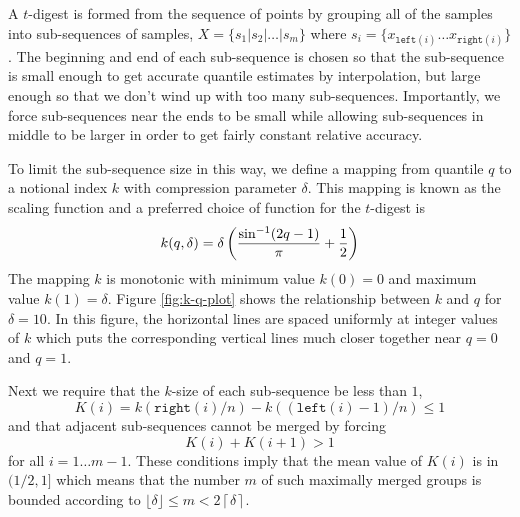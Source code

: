 \documentclass[11pt]{amsart}
\begin{document}
A $t$-digest is formed from the sequence of points by grouping all of the samples into sub-sequences of samples, $X = \lbrace s_1 | s_2 | \ldots | s_m \rbrace$ where $s_i = \lbrace x_{\mathtt {left}(i)} \ldots x_{\mathtt{right}(i)} \rbrace$.  The beginning and end of each sub-sequence is chosen so that the sub-sequence is small enough to get accurate quantile estimates by interpolation, but large enough so that we don't wind up with too many sub-sequences. Importantly, we force sub-sequences near the ends to be small while allowing sub-sequences in middle to be larger in order to get fairly constant relative accuracy.

To limit the sub-sequence size in this way, we define a mapping from quantile $q$ to a notional index $k$ with compression parameter $\delta$. This mapping is known as the scaling function and a preferred choice of function for the $t$-digest is 
\[
k(q, \delta) = \delta \left( {\frac {\sin^{-1} (2q-1)} \pi}   + {1 \over 2} \right)
\]
The mapping $k$ is monotonic with minimum value  $k(0)=0$ and maximum value  $k(1)=\delta$.  Figure \ref{fig:k-q-plot} shows the relationship between $k$ and $q$ for $\delta=10$. In this figure, the horizontal lines are spaced uniformly at integer values of $k$ which puts the corresponding vertical lines much closer together near $q=0$ and $q=1$.

Next we require that the $k$-size of each sub-sequence be less than $1$,
\[
K(i) = k \left (\mathtt{right}(i)/n \right) - k \left ((\mathtt{left}(i)-1)/n \right) \le 1
\]
and that adjacent sub-sequences cannot be merged by forcing
\[
K(i) + K(i+1) > 1
\]
for all $i=1\ldots m-1$. These conditions imply that the mean value of $K(i)$ is in $(1/2, 1]$ which means that the number $m$ of such maximally merged groups is bounded according to $ \lfloor\delta\rfloor \le m < 2\left \lceil\delta \right \rceil$. 
\end{document}
